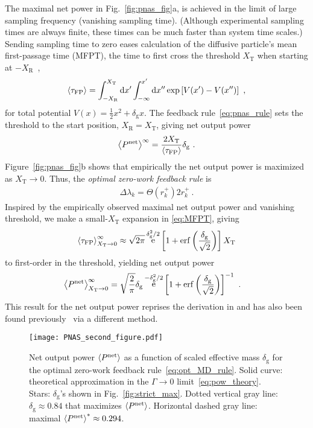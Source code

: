 \documentclass[%
reprint,
bibnotes, amsmath, amssymb, aps, pre,
 showkeys,
floatfix
]{revtex4-2}
\newcommand{\mrm}{\mathrm}
\newcommand{\pr}[1]{\left(#1\right)} %
\newcommand{\sr}[1]{\left[#1\right]} %
\newcommand{\dg}{\delta_{\mrm{g}}}
\newcommand{\dlk}{\Delta\lambda_{k}}
\newcommand{\xkpr}{r_{k}^{+}}
\newcommand{\epn}{\ev{P^{\mrm{net}}}}
\newcommand{\xT}{X_{\mrm{T}}}
\newcommand{\xR}{X_{\mrm{R}}}
\newcommand{\tmfp}{\ev{\tau_{\mrm{FP}}}}
\DeclareMathOperator{\e}{e}
\begin{document}
The maximal net power in Fig.~\ref{fig:pnas_fig}a, is achieved in the limit of large sampling frequency (vanishing sampling time).
(Although experimental sampling times are always finite, these times can be much faster than system time scales.)
Sending sampling time to zero eases calculation of the diffusive particle's mean first-passage time (MFPT), the time to first cross the threshold $\xT$ when starting at $-\xR$~\cite{Hanggi1990,Pontryagin1933}, 
\begin{align}
    \tmfp = \int_{-\xR}^{\xT}\dd{x'}\int_{-\infty}^{x'}\dd{x''} \exp\sr{V(x')-V(x'')}\label{eq:MFPT} \ ,
\end{align}
for total potential $V(x) = \frac{1}{2}x^{2}+\dg x$.
The feedback rule~\eqref{eq:pnas_rule} sets the threshold to the start position, $\xR=\xT$, giving net output power
\begin{align}
    \epn^{\infty} = \frac{2\xT}{\tmfp} \dg \ .
\end{align}
Figure~\ref{fig:pnas_fig}b shows that empirically the net output power is maximized as $\xT \to 0$.
Thus, the \emph{optimal zero-work feedback rule} is
\begin{align}
    \dlk = \Theta\pr{\xkpr}2\xkpr\ .\label{eq:opt_MD_rule}
\end{align}
Inspired by the empirically observed maximal net output power and vanishing threshold, we make a small-$\xT$ expansion in \eqref{eq:MFPT}, giving
\begin{align}
    \tmfp_{\xT\to0}^{\infty} \approx \sqrt{2\pi}\e^{\dg^{2}/2}\sr{1+\erf\pr{\frac{\dg}{\sqrt{2}}}}\xT\label{eq:MFPT_opt}
\end{align}
to first-order in the threshold, yielding net output power
\begin{align}
    \epn_{\xT\to 0}^{\infty} &= \sqrt{\frac{2}{\pi}}\dg\e^{-\dg^{2}/2}\sr{1+\erf\pr{\frac{\dg}{\sqrt{2}}}}^{-1} \ . \label{eq:pow_theory}
\end{align}
This result for the net output power reprises the derivation in \cite{Saha2021} and has also been found previously~\cite{Park2016} via a different method.

\begin{figure}[htbp]
    \centering
    \texttt{[image: PNAS\_second\_figure.pdf]}
    \caption{
        Net output power $\epn$ as a function of scaled effective mass $\dg$ for the optimal zero-work feedback rule~\eqref{eq:opt_MD_rule}.
        Solid curve: theoretical approximation in the $\Gamma\to 0$ limit~\eqref{eq:pow_theory}.
        Stars: $\dg$'s shown in Fig.~\ref{fig:strict_max}.
        Dotted vertical gray line: $\dg\approx 0.84$ that maximizes $\epn$.
        Horizontal dashed gray line: maximal $\epn^* \approx 0.294$.
        }
    \label{fig:pnas_fig2}
\end{figure}
\end{document}
